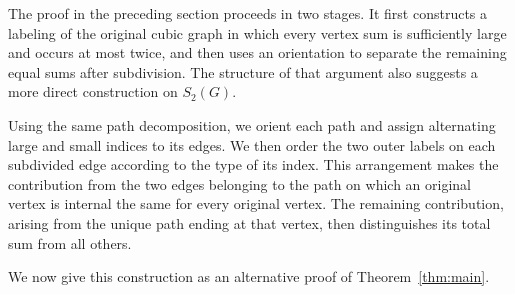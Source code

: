 \documentclass[preprint,12pt]{elsarticle}
\begin{document}
The proof in the preceding section proceeds in two stages. It first
constructs a labeling of the original cubic graph in which every vertex
sum is sufficiently large and occurs at most twice, and then uses an
orientation to separate the remaining equal sums after subdivision. The
structure of that argument also suggests a more direct construction on
\(S_2(G)\).

Using the same path decomposition, we orient each path and assign
alternating large and small indices to its edges. We then order the two
outer labels on each subdivided edge according to the type of its index.
This arrangement makes the contribution from the two edges belonging to
the path on which an original vertex is internal the same for every
original vertex. The remaining contribution, arising from the unique path
ending at that vertex, then distinguishes its total sum from all others.

We now give this construction as an alternative proof of
Theorem~\ref{thm:main}.
\end{document}
